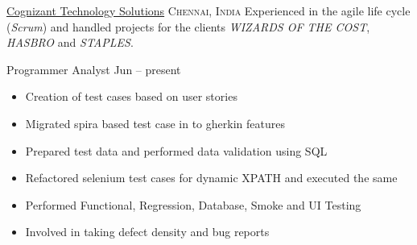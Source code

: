 
\headedsection  %
  {\href{https://www.cognizant.com}{Cognizant Technology Solutions}}
  {\textsc{Chennai, India}} 
  {\newline{}Experienced in the agile life cycle (\emph{Scrum}) and handled projects for the clients  \emph{WIZARDS OF THE COST}, \emph{HASBRO} and \emph{STAPLES}.
} 
  {%
  \headedsubsection
    {Programmer Analyst}
    {Jun  -- present}
    {\begin{itemize}
        \item Creation of test cases based on user stories 
        \item Migrated spira based test case in to gherkin features
        \item Prepared test data and performed data validation using SQL
        \item Refactored selenium test cases for dynamic XPATH and executed the same
        \item Performed Functional, Regression, Database, Smoke and UI Testing
        \item Involved in taking defect density and bug reports
    \end{itemize}
    }
}
